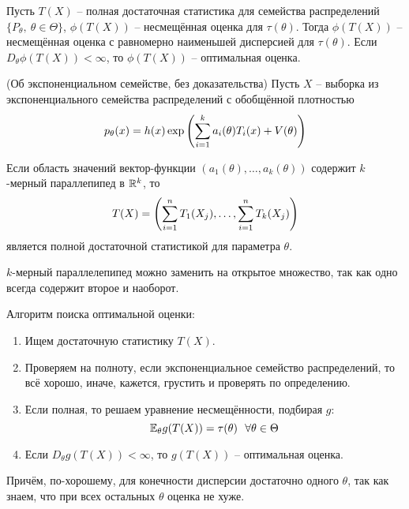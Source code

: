 \begin{corollary}
    Пусть $T(X)$ -- полная достаточная статистика для семейства распределений $\{P_\theta,\ \theta \in \Theta\}$, $\phi(T(X))$ -- несмещённая оценка для $\tau(\theta)$. Тогда $\phi(T(X))$ -- несмещённая оценка с равномерно наименьшей дисперсией для $\tau(\theta)$. Если $D_\theta \phi(T(X)) < \infty$, то $\phi(T(X))$ -- оптимальная оценка.
\end{corollary}

\begin{theorem} (Об экспоненциальном семействе, без доказательства)
    Пусть $X$ -- выборка из экспоненциального семейства распределений с обобщённой плотностью
    \[
        p_\theta(x) = h(x) \exp \left(\sum_{i=1}^k a_i(\theta) T_i(x) + V(\theta)\right)
    \]

    Если область значений вектор-функции $(a_1(\theta), \dots, a_k(\theta))$ содержит $k$-мерный параллепипед в $\mathbb{R}^k$, то
    \[
        T(X) = \left(\sum_{i=1}^n T_1(X_j), \dots, \sum_{i=1}^n T_k(X_j)\right)
    \]
    является полной достаточной статистикой для параметра $\theta$.
\end{theorem}

\begin{note}
    $k$-мерный параллелепипед можно заменить на открытое множество, так как одно всегда содержит второе и наоборот.
\end{note}

\begin{note}
    Алгоритм поиска оптимальной оценки:
    \begin{enumerate}
        \item Ищем достаточную статистику $T(X)$.
        \item Проверяем на полноту, если экспоненциальное семейство распределений, то всё хорошо, иначе, кажется, грустить и проверять по определению.
        \item Если полная, то решаем уравнение несмещённости, подбирая $g$:
        \[
            \E_\theta g(T(X)) = \tau(\theta) \ \ \forall \theta \in \Theta
        \]
        \item Если $D_\theta g(T(X)) < \infty$, то $g(T(X))$ -- оптимальная оценка.        
    \end{enumerate}
\end{note}

\begin{note}
    Причём, по-хорошему, для конечности дисперсии достаточно одного $\theta$, так как знаем, что при всех остальных $\theta$ оценка не хуже.
\end{note}